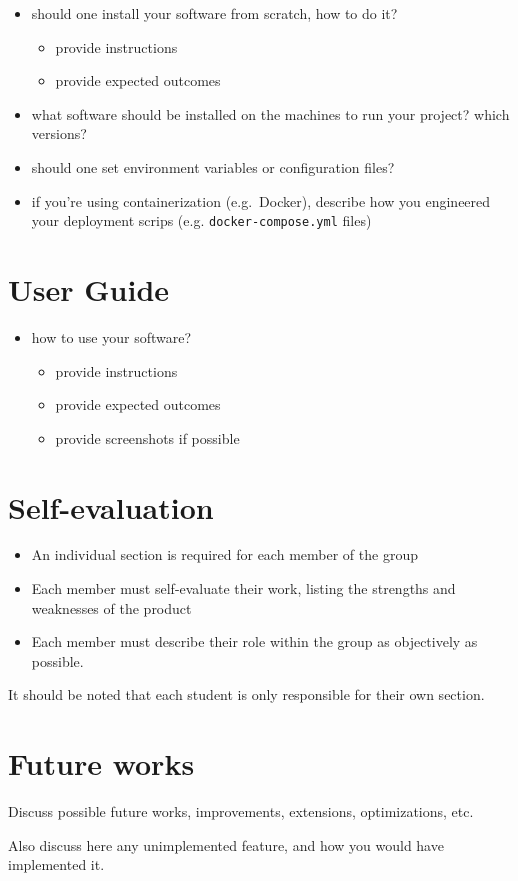 \documentclass{scrartcl}
\begin{document}
\begin{itemize}
  \item should one install your software from scratch, how to do it?
  \begin{itemize}
    \item provide instructions
    \item provide expected outcomes
  \end{itemize}

  \item what software should be installed on the machines to run your project? which versions?
  
  \item should one set environment variables or configuration files?
  
  \item if you're using containerization (e.g.~Docker), 
  describe how you engineered your deployment scrips (e.g. \texttt{docker-compose.yml} files)
\end{itemize}

\section{User Guide}\label{user-guide}

\begin{itemize}
  \item how to use your software?
  \begin{itemize}
    \item provide instructions
    \item provide expected outcomes
    \item provide screenshots if possible
  \end{itemize}
\end{itemize}

\section{Self-evaluation}\label{self-evaluation}

\begin{itemize}
  \item An individual section is required for each member of the group
  \item Each member must self-evaluate their work, listing the strengths and weaknesses of the product
  \item Each member must describe their role within the group as objectively as possible.
\end{itemize}

It should be noted that each student is only responsible for their own section.

\section{Future works}\label{future-works}

Discuss possible future works, improvements, extensions, optimizations, etc.

Also discuss here any unimplemented feature, and how you would have implemented it.



\end{document}
